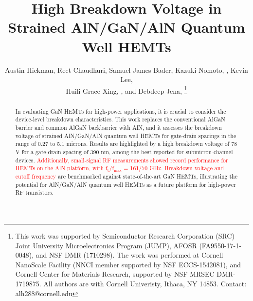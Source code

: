 \documentclass[journal]{IEEEtran}
\newif\ifarxiv
\begin{document}
\title{High Breakdown Voltage in Strained AlN/GaN/AlN Quantum Well HEMTs}

\author{Austin Hickman, Reet Chaudhuri, Samuel James Bader, Kazuki Nomoto, , Kevin Lee, \\ Huili Grace Xing, , and Debdeep Jena, %
\thanks{
  This work was supported by Semiconductor Research Corporation (SRC) Joint University Microelectronics Program (JUMP), AFOSR (FA9550-17-1-0048), and NSF DMR (1710298). The work was performed at Cornell NanoScale Facility (NNCI member supported by NSF ECCS-1542081), and Cornell Center for Materials Research, supported by NSF MRSEC DMR-1719875. All authors are with Cornell Univeristy, Ithaca, NY 14853. Contact: alh288@cornell.edu }}

\ifarxiv \else
{}%
{}
\fi
% 

\maketitle

\begin{abstract}
In evaluating GaN HEMTs for high-power applications, it is crucial to consider the device-level breakdown characteristics. This work replaces the conventional AlGaN barrier and common AlGaN backbarrier with AlN, and it assesses the breakdown voltage of strained AlN/GaN/AlN quantum well HEMTs for gate-drain spacings in the range of 0.27 to 5.1 microns. Results are highlighted by a high breakdown voltage of 78 V for a gate-drain spacing of 390 nm, among the best reported for submicron-channel devices. \textcolor{red}{Additionally, small-signal RF measurements showed record performance for HEMTs on the AlN platform, with $\mathrm{f_t/f_{max}}$ = 161/70 GHz. Breakdown voltage and cutoff frequency} are benchmarked against state-of-the-art GaN HEMTs, illustrating the potential for AlN/GaN/AlN quantum well HEMTs as a future platform for high-power RF transistors.
\end{abstract}
\end{document}
